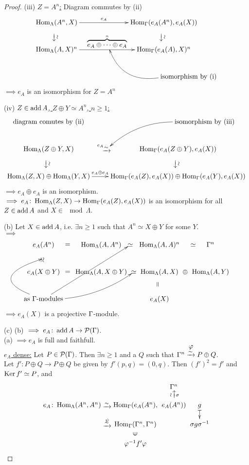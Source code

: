 \begin{proof}
(iii) \underline{$Z = A^n$:} Diagram commutes by (ii)
\[\xymatrix@C+4pc{
\Hom_\Lambda(A^n, X) \ar@{}[d]|-*[@]{\xrightarrow{\sim}} \ar[r]^-{e_A} & \ar@{}[d]|-*[@]{\xrightarrow{\sim}}\Hom_\G(e_A(A^n), e_A(X))\\
\Hom_\Lambda(A, X)^n \ar[r]^-{\overbrace{e_A \oplus \cdots \oplus e_A}^n}="pil" & \Hom_\G(e_A(A), X)^n\\
& *+[r]{\text{isomorphism by (i)}} \ar@/^2pc/;"pil" 
}\]
$\implies e_A$ is an isomorphism for $Z=A^n$


(iv) \underline{$Z \in \operatorname{add} A$, $Z \oplus Y \simeq A^n$, $n \geq 1$:}
\[\xymatrix{
\text{diagram comutes by (ii)}\ar@{}[r]="b" &  *+[r]{\text{isomorphism by (iii)}}\\
\Hom_\Lambda(Z \oplus Y, X) \ar@{}[r]^<<<<<<<<<<<<<{e_A}|-*[@]{\xrightarrow{\sim}}="a" \ar@/^1pc/@{<-}"a";"b" \ar@{}[d]|-*[@]{\xrightarrow{\sim}} & \Hom_\G(e_A(Z \oplus Y), e_A(X)) \ar@{}[d]|-*[@]{\xrightarrow{\sim}} \\
\Hom_\Lambda(Z, X) \oplus \Hom_\Lambda(Y, X) \ar[r]^-{e_A \oplus e_A} & \Hom_\G(e_A(Z), e_A(X)) \oplus \Hom_\G(e_A(Y), e_A(X))
}\]
$\implies e_A \oplus e_A$ is an isomorphism.\\
$\implies e_A \colon \operatorname{Hom}_\Lambda(Z, X) \to \operatorname{Hom}_\Gamma(e_A(Z), e_A(X))$ is an isomorphism for all $Z \in \operatorname{add} A$ and $X \in \mod \Lambda$.

(b) Let $X \in \operatorname{add} A$, i.e. $\exists n \geq 1$ such that $A^n \simeq X \oplus Y $ for some $Y$.\\
$\implies$
\[\xymatrix@C-1pc{
e_A(A^n) \ar@{}[r]|-*[@]{=} \ar@{}[d]|-*[@]{\simeq}="s1" & \Hom_\Lambda(A, A^n) \ar@{}[r]|-*[@]{\simeq}="s2" & \Hom_\Lambda(A, A)^n \ar@{}[r]|-*[@]{\simeq} & \G^n\\
e_A(X \oplus Y) \ar@{}[r]|-*[@]{=} & \Hom_\Lambda(A, X \oplus Y) \ar@{}[r]|-*[@]{\simeq}="s3" & \Hom_\Lambda(A, X) \ar@{}[r]|-*[@]{\oplus} & \Hom_\Lambda(A, Y)\\
\text{as }\G\text{-modules} \ar@/^4pc/;"s1" \ar;"s2"|!{[u];[ur]}\hole \ar@/_1pc/;"s3" & & e_A(X) \ar@{}[u]|-*[@]{=}
}\]
$\implies e_A(X)$ is a projective $\Gamma$-module.

(c) (b) $\implies e_A \colon \operatorname{add} A \to \mathcal{P}(\Gamma)$.\\
(a) $\implies e_A$ is full and faithfull.\\
\underline{$e_A$ dense:} Let $P \in \mathcal{P}(\Gamma)$. Then $\exists n
\geq 1$ and a $Q$ such that $\G^n
\stackrel{\mathclap{\normalfont\mbox{$\varphi$}}}{\xrightarrow{\sim}}
P \oplus Q$.\\ 
Let $f'\colon P \oplus Q \to P \oplus Q$ be given by $f'(p, q) = (0, q)$. Then $(f')^2 = f'$ and $\operatorname{Ker}\nolimits f' \simeq P$, and
\[\xymatrix@C-2pc@R-1pc{
                   &                              &&& \G^n\\
e_A \colon \Hom_\Lambda(A^n, A^n) \ar@{}[rrr]|-*[@]{\xrightarrow{\sim}} &&& \Hom_\G(e_A(A^n), & e_A(A^n)) \ar@{}[u]|-*[@]{\xrightarrow{\sim}}_-\sigma & g \ar@{|->}[d]\\
&\ar@{}[r]|-*[@]{\xrightarrow{\sim}}^-\psi && \Hom_\G(\G^n, \G^n) && \sigma g \sigma^{-1}\\
 &&& \varphi^{-1}f'\varphi \ar@{}[u]|-*[@]{\in}
}\]


\end{proof}
